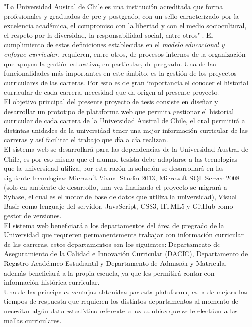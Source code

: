 
			"La Universidad Austral de Chile es una institución acreditada que forma profesionales y graduados de pre 
			y postgrado, con un sello caracterizado por la excelencia académica, el compromiso con la libertad y con 
			el medio sociocultural, el respeto por la diversidad, la responsabilidad social, entre otros"\hspace{0.2cm} \cite{MOD07}. 
			El cumplimiento de estas definiciones establecidas en el \textit{ modelo educacional y enfoque curricular}, requieren, entre otros, de procesos internos de la organización que apoyen la gestión educativa, en particular, de pregrado. Una de las funcionalidades más importantes en este ámbito, es la gestión de los proyectos curriculares de las carreras. Por esto es de gran importancia el conocer el historial curricular de cada carrera, necesidad que da origen al presente proyecto.
			\\
			
			El objetivo principal del presente proyecto de tesis consiste en diseñar y desarrollar un prototipo de 
			plataforma web que permita gestionar el historial curricular de cada carrera de la Universidad Austral 
			de Chile, el cual permitirá a distintas unidades de la universidad tener una mejor información curricular 
			de las carreras y así facilitar el trabajo que día a día realizan.
			\\

			
			El sistema web se desarrollará para las dependencias de la Universidad Austral de Chile, es por eso mismo que
			el alumno tesista debe adaptarse a las tecnologías que la universidad utiliza, por esta razón la solución se 
			desarrollará en las siguiente tecnologías: Microsoft Visual Studio 2013, Microsoft SQL Server 2008 
			(solo en ambiente de desarrollo, una vez finalizado el proyecto se migrará a Sybase, el cual es el motor 
			de base de datos que utiliza la universidad), Visual Basic como lenguaje del servidor, JavaScript, CSS3, HTML5 
			y GitHub como gestor de versiones.
			\\

			
			El sistema web beneficiará a los departamentos del área de pregrado de la Universidad que requieren permanentemente trabajar con información curricular de las carreras, estos departamentos son los siguientes: 
			Departamento de Aseguramiento de la Calidad e Innovación Curricular (DACIC), Departamento de Registro 
			Académico Estudiantil y  Departamento de Admisión y Matricula, además beneficiará a la propia escuela, ya que les permitirá contar con
			información histórica curricular.
			\\
			
			Una de las principales ventajas obtenidas por esta plataforma, es la de  mejora los tiempos de respuesta que requieren los distintos departamentos al momento de necesitar algún dato estadístico referente a los cambios que se le efectúan a las mallas curriculares. 
			

			